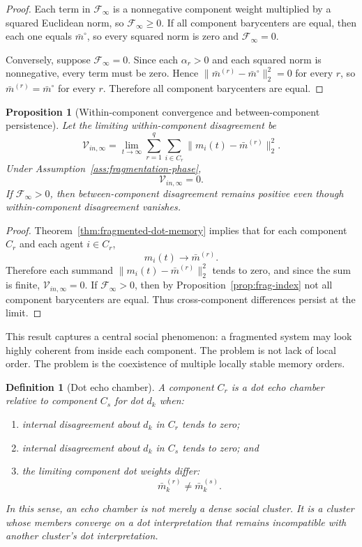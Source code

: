 \documentclass[11pt]{article}
\newtheorem{definition}{Definition}
\newtheorem{proposition}{Proposition}
\theoremstyle{remark}
\begin{document}
\begin{proof}
Each term in $\mathcal{F}_\infty$ is a nonnegative component weight
multiplied by a squared Euclidean norm, so $\mathcal{F}_\infty\geq0$.
If all component barycenters are equal, then each one equals
$\bar m^\circ$, so every squared norm is zero and
$\mathcal{F}_\infty=0$.

Conversely, suppose $\mathcal{F}_\infty=0$. Since each $\alpha_r>0$ and
each squared norm is nonnegative, every term must be zero. Hence
$\|\bar m^{(r)}-\bar m^\circ\|_2^2=0$ for every $r$, so
$\bar m^{(r)}=\bar m^\circ$ for every $r$. Therefore all component
barycenters are equal.
\end{proof}

\begin{proposition}[Within-component convergence and between-component persistence]
Let the limiting within-component disagreement be
$$
\mathcal{V}_{in,\infty}
=\lim_{t\to\infty}\sum_{r=1}^q\sum_{i\in C_r}
\|m_i(t)-\bar m^{(r)}\|_2^2.
$$
Under Assumption~\ref{ass:fragmentation-phase},
$$
\mathcal{V}_{in,\infty}=0.
$$
If $\mathcal{F}_\infty>0$, then between-component disagreement remains
positive even though within-component disagreement vanishes.
\end{proposition}

\begin{proof}
Theorem~\ref{thm:fragmented-dot-memory} implies that for each component
$C_r$ and each agent $i\in C_r$,
$$
m_i(t)\to \bar m^{(r)}.
$$
Therefore each summand
$\|m_i(t)-\bar m^{(r)}\|_2^2$ tends to zero, and since the sum is finite,
$\mathcal{V}_{in,\infty}=0$. If $\mathcal{F}_\infty>0$, then by
Proposition~\ref{prop:frag-index} not all component barycenters are
equal. Thus cross-component differences persist at the limit.
\end{proof}

This result captures a central social phenomenon: a fragmented system
may look highly coherent from inside each component. The problem is not
lack of local order. The problem is the coexistence of multiple locally
stable memory orders.

\begin{definition}[Dot echo chamber]
A component $C_r$ is a dot echo chamber relative to component $C_s$ for
dot $d_k$ when:
\begin{enumerate}[label=(\roman*)]
\item internal disagreement about $d_k$ in $C_r$ tends to zero;
\item internal disagreement about $d_k$ in $C_s$ tends to zero; and
\item the limiting component dot weights differ:
$$
\bar m^{(r)}_k\neq \bar m^{(s)}_k.
$$
\end{enumerate}
In this sense, an echo chamber is not merely a dense social cluster. It
is a cluster whose members converge on a dot interpretation that remains
incompatible with another cluster's dot interpretation.
\end{definition}
\end{document}
